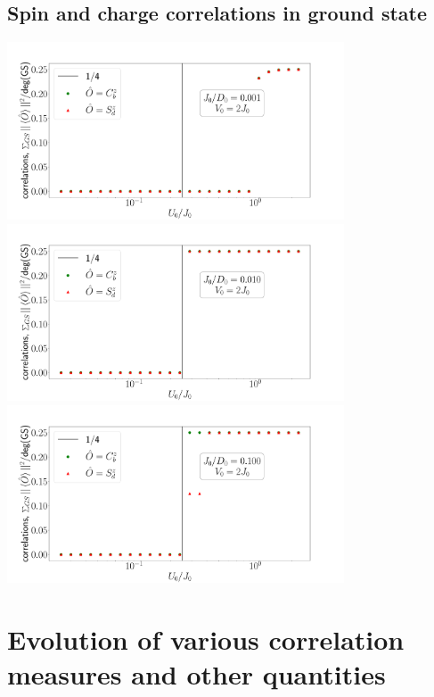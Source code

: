 \documentclass{report}
\numberwithin{equation}{section}
\begin{document}
\subsection*{Spin and charge correlations in ground state}
\begin{center}
	\includegraphics[width=0.75\textwidth]{../figures/corrs_gs_D=400,J=0.400.pdf}\\
	\includegraphics[width=0.75\textwidth]{../figures/corrs_gs_D=400,J=4.000.pdf}\\
	\includegraphics[width=0.75\textwidth]{../figures/corrs_gs_D=400,J=40.000.pdf}
\end{center}

\section{Evolution of various correlation measures and other quantities}
\end{document}
